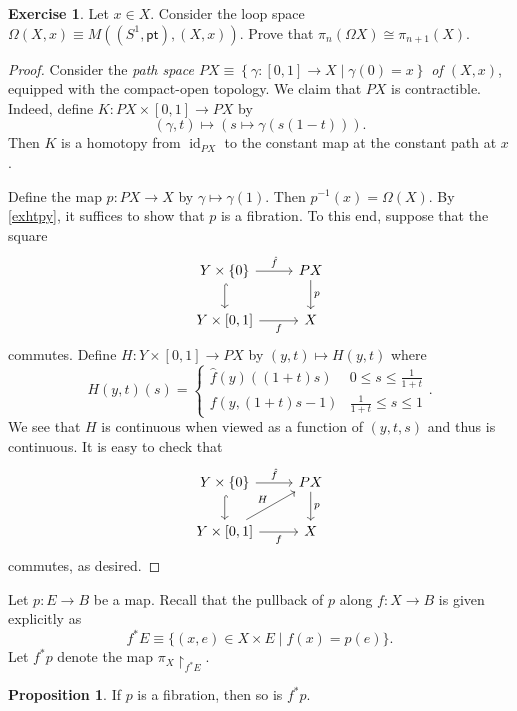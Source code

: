 \documentclass[10pt,letterpaper,cm]{nupset}
\theoremstyle{definition}
\theoremstyle{theorem}
\newtheorem{prop}[defn]{Proposition}
\newtheorem{exercise}[defn]{Exercise}
\theoremstyle{remark}
\newcommand{\1}{\mathbb{1}}
\newcommand{\0}{\vec 0}
\newcommand{\pt}{\mathsf{pt}}
\DeclareMathOperator{\id}{id}
\begin{document}
\begin{exercise}\label{loop}
Let $x\in X$. Consider the  loop space $\Omega(X, x) \equiv M((S^1, \pt), (X, x))$. Prove that $\pi_n(\Omega{X})\cong \pi_{n+1}(X)$.
\end{exercise}
\begin{proof}
Consider the \textit{path space $P{X} \equiv \left\{\gamma : [0,1] \to X \mid \gamma(0) =x\right\}$ of $\left(X,x\right)$}, equipped with the compact-open topology. We claim that $P{X}$ is contractible. Indeed, define $K: P{X} \times [0,1] \to P{X}$ by $$\left(\gamma, t\right) \mapsto \left(s \mapsto \gamma(s(1-t))\right).$$ Then $K$ is a homotopy from $\id_{P{X}}$ to the constant map at the constant path at $x$.

\medskip

Define the map $p : P{X} \to X$ by $\gamma \mapsto \gamma(1)$. Then $p^{-1}(x) = \Omega(X)$. By \cref{exhtpy}, it suffices to show that $p$ is a fibration. To this end, suppose that the square
\[
\begin{tikzcd}
Y\times \{0\} \arrow[d, hook] \arrow[r, "\hat{f}"] & P{X} \arrow[d, "p"] \\
{Y\times [0,1]} \arrow[r, "f"']                    & X                  
\end{tikzcd}
\] commutes. Define $H: Y \times [0,1] \to P{X}$ by $\left(y, t\right) \mapsto  H(y,t)$ where 
\[
H(y, t)(s) = \begin{cases} 
\hat{f}(y)\left((1+t)s\right) & 0\leq s\leq \frac{1}{1+t}
\\ f(y, (1+t)s -1) & \frac{1}{1+t}\leq s \leq 1
\end{cases}.
\] We see that $H$ is continuous when viewed as a function of $\left(y,t,s\right)$ and thus is continuous. It is easy to check that 
\[
\begin{tikzcd}
Y\times \{0\} \arrow[d, hook] \arrow[r, "\hat{f}"] & P{X} \arrow[d, "p"] \\
{Y\times [0,1]} \arrow[r, "f"'] \arrow[ru, "H"]    & X                  
\end{tikzcd}
\] commutes, as desired.
\end{proof}

Let $p : E \to B$ be a map. Recall that the pullback of $p$ along $f : X \to B$ is given explicitly as   $$f^{\ast}{E} \equiv \{(x, e) \in X \times E \mid f(x) = p(e)\}.$$  Let  $f^{\ast}{p}$ denote the map $\pi_X\restriction_{f^{\ast}{E}}$.

\begin{prop}
If $p$ is a fibration, then so is $f^{\ast}{p}$.
\end{prop}
\end{document}
